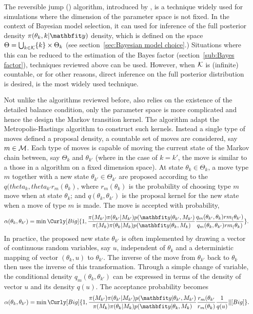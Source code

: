 The reversible jump \mcmc (\rjmcmc) algorithm, introduced by
\textcite{Green:1995dg}, is a technique widely used for simulations where the
dimension of the parameter space is not fixed. In the context of Bayesian
model selection, it can used for inference of the full posterior density
$\pi(\theta_k,k|\data)$ density, which is defined on the space $\Theta =
\bigcup_{k\in\mathcal{K}}\{k\}\times\Theta_k$ (see section~\ref{sec:Bayesian model
  choice}.) Situations where this can be reduced to the estimation of the
Bayes factor (section~\ref{sub:Bayes factor}), techniques reviewed above can
be used. However, when $\mathcal{K}$ is (infinite) countable, or for other reasons,
direct inference on the full posterior distribution is desired, \rjmcmc is the
most widely used technique.

Not unlike the \mcmc algorithms reviewed before, \rjmcmc also relies on the
existence of the detailed balance condition, only the parameter space is more
complicated and hence the design the Markov transition kernel. The \rjmcmc
algorithm adapt the Metropolis-Hastings algorithm to construct such kernels.
Instead a single type of moves defined a proposal density, a countable set of
moves are considered, say $m\in\mathcal{M}$. Each type of moves is capable of moving
the current state of the Markov chain between, say $\Theta_k$ and
$\theta_{k'}$ (where in the case of $k = k'$, the move is similar to a those
in a \mcmc algorithm on a fixed dimension space). At state
$\theta_k\in\Theta_k$, a move type $m$ together with a new state
$\theta_{k'}\in\Theta_{k'}$ are proposed according to the
$q(theta_k,theta_{k'}r_m(\theta_k)$, where $r_m(\theta_k)$ is the probability
of choosing type $m$ move when at state $\theta_k$; and
$q(\theta_k,\theta_{k'})$ is the proposal kernel for the new state when a move
of type $m$ is made. The move is accepted with probability,
\begin{equation}
  \alpha(\theta_k,\theta_{k'}) =
  \min\Curly[Big]{1,
    \frac{\pi(M_{k'})\pi(\theta_{k'}|M_{k'})p(\data|\theta_{k'},M_{k'})}
    {\pi(M_k)\pi(\theta_k|M_k)p(\data|\theta_k,M_k)}
    \frac{q_m(\theta_{k'},\theta_k)rm_(\theta_{k'})}
    {q_m(\theta_k,\theta_{k'})rm_(\theta_k)}
  }.
\end{equation}
In practice, the proposed new state $\theta_{k'}$ is often implemented by
drawing a vector of continuous random variables, say $u$, independent of
$\theta_k$ and a deterministic mapping of vector $(\theta_k,u)$ to
$\theta_{k'}$. The inverse of the move from $\theta_{k'}$ back to $\theta_k$
then uses the inverse of this transformation. Through a simple change of
variable, the conditional density $q_m(\theta_k,\theta_{k'})$ can be expressed
in terms of the density of vector $u$ and its density $q(u)$. The acceptance
probability becomes
\begin{equation}
  \alpha(\theta_k,\theta_{k'}) =
  \min\Curly[Big]{1,
    \frac{\pi(M_{k'})\pi(\theta_{k'}|M_{k'})p(\data|\theta_{k'},M_{k'})}
    {\pi(M_k)\pi(\theta_k|M_k)p(\data|\theta_k,M_k)}
    \frac{r_m(\theta_{k'}}{r_m(\theta_k)}
    \frac{1}{q(u)}
    \Vert[Big]{

    }
  }.
\end{equation}

